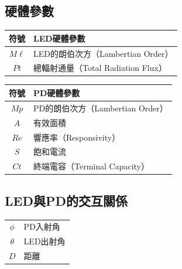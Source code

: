 

\onehalfspacing

\subsection*{硬體參數}

\begin{longtable}[l]{cl}
    符號 & LED硬體參數\\ \hline
    $M\ell$ & LED的朗伯次方（Lambertian Order）\\
    $Pt$ & 總輻射通量（Total Radiation Flux） 
\end{longtable}

\begin{longtable}[l]{cl}
    符號 & PD硬體參數\\ \hline
    $Mp$ & PD的朗伯次方（Lambertian Order）\\
    $A$ & 有效面積\\
    $Re$ & 響應率（Responsivity）\\
    $S$ &飽和電流\\
    $Ct$&終端電容（Terminal Capacity）\\
\end{longtable}


\onehalfspacing

\subsection*{LED與PD的交互關係}

\begin{longtable}[l]{cl}
    $\phi$ & PD入射角\\
    $\theta$ & LED出射角\\
    $D$&距離\\
\end{longtable}

